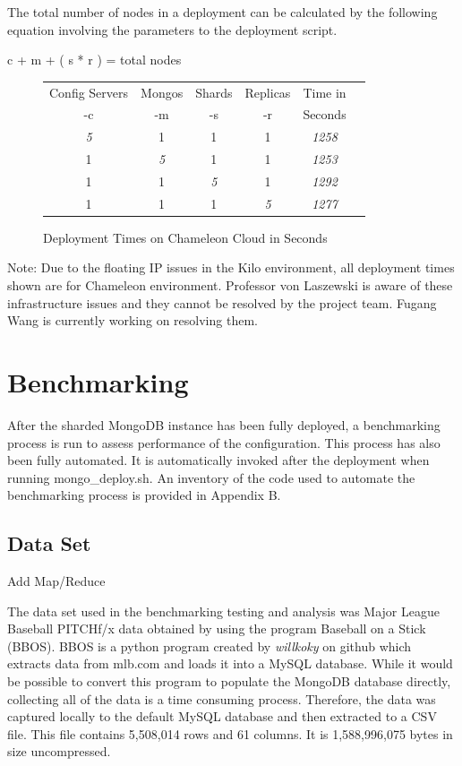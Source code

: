 \documentclass[9pt,twocolumn,twoside]{../../styles/osajnl}
\begin{document}
The total number of nodes in a deployment can be calculated by the following equation involving the parameters to the deployment script.

c + m + ( s * r ) = total nodes

\begin{figure}[ht]
\begin{center}
 \begin{tabular}{| c | c | c | c | c | c |} 
 \hline
Config Servers &  Mongos & Shards & Replicas & Time in \\
-c &  -m & -s & -r & Seconds
\\ [0.5ex] 
 \hline
 \hline
\emph{5} & 1 & 1 & 1 & \emph{1258} \\
 \hline
 1 & \emph{5}  & 1 & 1 & \emph{1253} \\
 \hline
 1 & 1 & \emph{5} & 1 & \emph{1292} \\
 \hline
 1 & 1 & 1 & \emph{5}  & \emph{1277}  \\ [1ex] 
 \hline
\end{tabular}
\end{center}
  \caption{Deployment Times on Chameleon Cloud in Seconds}
\end{figure}

Note: Due to the floating IP issues in the Kilo environment, all deployment times shown are for Chameleon environment.  Professor von Laszewski is aware of these infrastructure issues and they cannot be resolved by the project team.  Fugang Wang is currently working on resolving them.


\section{Benchmarking}

After the sharded MongoDB instance has been fully deployed, a benchmarking process is run to assess performance of the configuration.  This process has also been fully automated.  It is automatically invoked after the deployment when running mongo\_deploy.sh.  An inventory of the code used to automate the benchmarking process is provided in Appendix B.


\subsection{Data Set}

Add Map/Reduce

The data set used in the benchmarking testing and analysis was Major League Baseball PITCHf/x data obtained by using the program Baseball on a Stick (BBOS).  \cite{www-bbos}  BBOS is a python program created by 
\emph{willkoky} on github which extracts data from mlb.com and loads it into a MySQL database.  While it would be possible to convert this program to populate the MongoDB database directly, collecting all of the data is a time consuming process. Therefore, the data was captured locally to the default MySQL database and then extracted to a CSV file.  This file contains 5,508,014 rows and 61 columns.  It is 1,588,996,075 bytes in size uncompressed.
\end{document}
